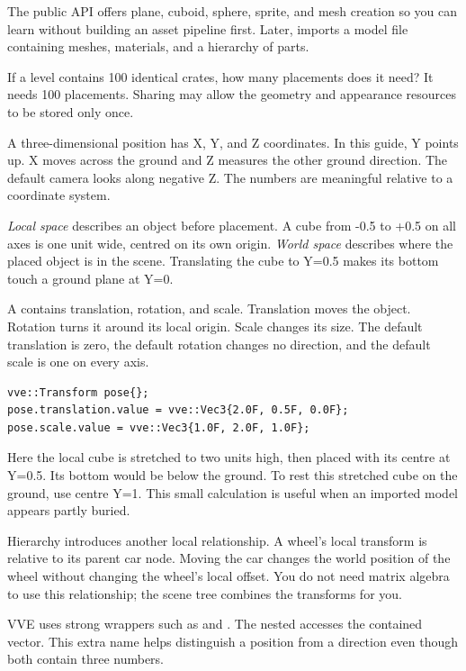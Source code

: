\documentclass[11pt,a4paper]{article}
\begin{document}
The public API offers plane, cuboid, sphere, sprite, and mesh creation so you can learn without building an asset pipeline first. Later,  imports a model file containing meshes, materials, and a hierarchy of parts.

\begin{tryit}If a level contains 100 identical crates, how many placements does it need? It needs 100 placements. Sharing may allow the geometry and appearance resources to be stored only once.\end{tryit}

A three-dimensional position has X, Y, and Z coordinates. In this guide, Y points up. X moves across the ground and Z measures the other ground direction. The default camera looks along negative Z. The numbers are meaningful relative to a coordinate system.

\emph{Local space} describes an object before placement. A cube from -0.5 to +0.5 on all axes is one unit wide, centred on its own origin. \emph{World space} describes where the placed object is in the scene. Translating the cube to Y=0.5 makes its bottom touch a ground plane at Y=0.

A  contains translation, rotation, and scale. Translation moves the object. Rotation turns it around its local origin. Scale changes its size. The default translation is zero, the default rotation changes no direction, and the default scale is one on every axis.
\begin{lstlisting}
vve::Transform pose{};
pose.translation.value = vve::Vec3{2.0F, 0.5F, 0.0F};
pose.scale.value = vve::Vec3{1.0F, 2.0F, 1.0F};
\end{lstlisting}
Here the local cube is stretched to two units high, then placed with its centre at Y=0.5. Its bottom would be below the ground. To rest this stretched cube on the ground, use centre Y=1. This small calculation is useful when an imported model appears partly buried.

Hierarchy introduces another local relationship. A wheel's local transform is relative to its parent car node. Moving the car changes the world position of the wheel without changing the wheel's local offset. You do not need matrix algebra to use this relationship; the scene tree combines the transforms for you.

VVE uses strong wrappers such as  and . The nested  accesses the contained vector. This extra name helps distinguish a position from a direction even though both contain three numbers.
\end{document}
